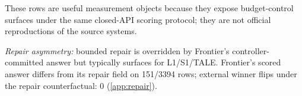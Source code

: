 
\vspace{0.25cm}
\noindent These rows are useful measurement objects because they expose budget-control surfaces
under the same closed-API scoring protocol; they are not official reproductions of the source
systems.

\vspace{0.15cm}
\noindent\textit{Repair asymmetry:} bounded repair is overridden by Frontier's controller-committed
answer but typically surfaces for L1/S1/TALE. Frontier's scored answer differs from its repair
field on 151/3394 rows; external winner flips under the repair counterfactual: 0
(\ref{app:repair}).
